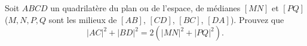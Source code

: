 Soit $ABCD$ un quadrilatère du plan ou de l'espace, de médianes $[MN]$ et
$[PQ]$ ($M, N, P, Q$ sont les milieux de $[AB]$, $[CD]$, $[BC]$, $[DA]$).
Prouvez que
\[
|AC|^2 + |BD|^2 = 2\left( |MN|^2 + |PQ|^2 \right).
\]
